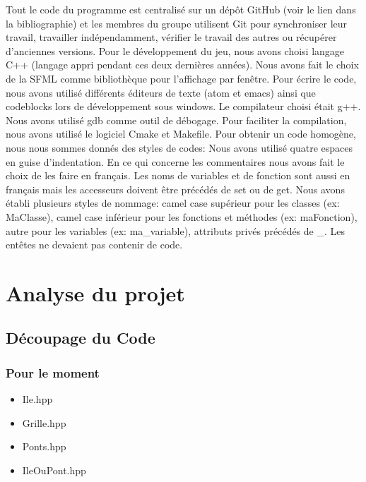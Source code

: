\documentclass{article}
\begin{document}
    \hspace{0.5cm} Tout le code du programme est centralisé sur un dépôt GitHub (voir le lien dans la bibliographie) et les membres du groupe utilisent Git pour synchroniser leur travail, travailler indépendamment, vérifier le travail des autres ou récupérer d’anciennes versions.
    Pour le développement du jeu, nous avons choisi langage C++ (langage appri pendant ces deux dernières années).
    Nous avons fait le choix de la SFML comme bibliothèque pour l'affichage par fenêtre.
    Pour écrire le code, nous avons utilisé différents éditeurs de texte (atom et emacs) ainsi que codeblocks lors de développement sous windows. Le compilateur choisi était g++. Nous avons utilisé gdb comme outil de débogage. Pour faciliter la compilation, nous avons utilisé le logiciel Cmake et Makefile. \newline
    Pour obtenir un code homogène, nous nous sommes donnés des styles de codes: Nous avons utilisé quatre espaces en guise d'indentation. En ce qui concerne les commentaires nous avons fait le choix de les faire en français. Les noms de variables et de fonction sont aussi en français mais les accesseurs doivent être précédés de set ou de get. Nous avons établi plusieurs styles de nommage: camel case supérieur pour les classes (ex: MaClasse), camel case inférieur pour les fonctions et méthodes (ex: maFonction), autre pour les variables (ex: ma\_variable), attributs privés précédés de \_. Les entêtes ne devaient pas contenir de code.

\section{\LARGE Analyse du projet}

    \subsection{\Large Découpage du Code}
        \subsubsection{Pour le moment}
        \begin{itemize}
        \item Ile.hpp
        \item Grille.hpp
        \item Ponts.hpp
        \item IleOuPont.hpp
        \end{itemize}
\end{document}
